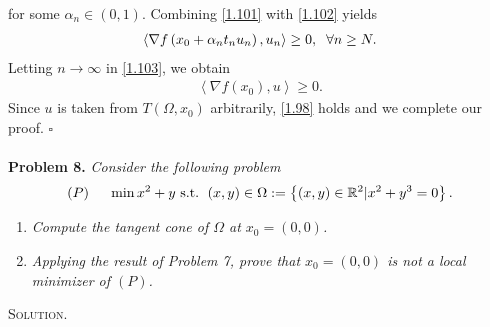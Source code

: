 \documentclass[a4paper]{article}
\numberwithin{equation}{section}
\begin{document}
for some $\alpha _n\in \left(0,1\right)$. Combining \eqref{1.101} with \eqref{1.102} yields
\begin{align}
\label{1.103}
\left\langle {\nabla f\left( {{x_0} + {\alpha _n}{t_n}{u_n}} \right),{u_n}} \right\rangle  \ge 0,\hspace{0.2cm} \forall n \ge N.
\end{align}
Letting $n\to \infty$ in \eqref{1.103}, we obtain
\begin{align}
\left\langle {\nabla f\left( {{x_0}} \right),u} \right\rangle  \ge 0.
\end{align}
Since $u$ is taken from $T\left(\Omega, x_0\right)$ arbitrarily, \eqref{1.98} holds and we complete our proof. \hfill $\square$\\
\\
\textbf{Problem 8.} \textit{Consider the following problem}
\begin{align}
\left( P \right)\hspace{0.5cm}\min {x^2} + y\mbox{ s.t. } \left( {x,y} \right) \in \Omega : = \left\{ {\left( {x,y} \right) \in {\mathbb{R}^2}|{x^2} + {y^3} = 0} \right\}.
\end{align}
\begin{enumerate}
\item \textit{Compute the tangent cone of $\Omega$ at $x_0=\left(0,0\right)$. }
\item \textit{Applying the result of Problem 7, prove that $x_0=\left(0,0\right)$ is not a local minimizer of $\left(P\right)$.}
\end{enumerate}
\textsc{Solution.}
\end{document}
